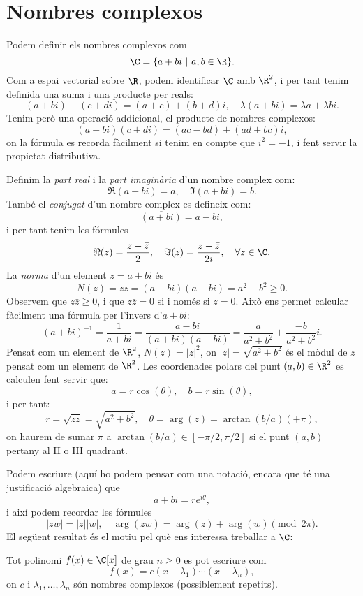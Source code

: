
\appendix
\section{Nombres complexos}
Podem definir els nombres complexos com
\[
\C =\{a+bi ~|~ a,b\in\R\}.
\]
Com a espai vectorial sobre $\R$, podem identificar $\C$ amb $\R^2$, i per tant tenim definida una suma i una producte per reals:
\[
(a+bi) + (c+di) = (a+c) + (b+d)i, \quad \lambda(a+bi)=\lambda a + \lambda b i.
\]
Tenim però una operació addicional, el producte de nombres complexos:
\[
(a+bi)(c+di) = (ac-bd) + (ad+bc)i,
\]
on la fórmula es recorda fàcilment si tenim en compte que $i^2=-1$, i fent servir la propietat distributiva.

Definim la \emph{part real} i la \emph{part imaginària}  d'un nombre complex com:
\[
\Re(a+bi) = a,\quad \Im(a+bi) = b.
\]
També el \emph{conjugat} d'un nombre complex es defineix com:
\[
\overline{(a+bi)} = a-bi,
\]
i per tant tenim les fórmules
\[
\Re(z) = \frac{z+\bar z}{2},\quad \Im(z)=\frac{z-\bar z}{2i},\quad \forall z\in\C.
\]
La \emph{norma} d'un element $z=a+bi$ és
\[
N(z) = z\bar z = (a+bi)(a-bi) = a^2+b^2\geq 0.
\]
Observem que $z\bar z \geq 0$, i que $z\bar z = 0$ si i només si $z=0$. Això ens permet calcular fàcilment una fórmula per l'invers d'$a+bi$:
\[
(a+bi)^{-1} = \frac{1}{a+bi} = \frac{a-bi}{(a+bi)(a-bi)} = \frac{a}{a^2+b^2}+\frac{-b}{a^2+b^2}i.
\]
Pensat com un element de $\R^2$, $N(z)=|z|^2$, on $|z|=\sqrt{a^2+b^2}$ és el mòdul de $z$ pensat com un element de $\R^2$. Les coordenades polars del punt $(a,b)\in\R^2$ es calculen fent servir que:
\[
a = r\cos(\theta),\quad b = r\sin(\theta),
\]
i per tant:
\[
r = \sqrt{z\bar z}=\sqrt{a^2+b^2},\quad \theta = \arg(z) = \arctan(b/a) (+\pi),
\]
on haurem de sumar $\pi$ a $\arctan(b/a)\in[-\pi/2,\pi/2]$ si el punt $(a,b)$ pertany al II o III quadrant.

Podem escriure (aquí ho podem pensar com una notació, encara que té una justificació algebraica) que
\[
a+bi = re^{i\theta},
\]
i així podem recordar les fórmules
\[
|zw|=|z||w|,\quad \arg(zw)=\arg(z)+\arg(w)\pmod{2\pi}.
\]
El següent resultat és el motiu pel què ens interessa treballar a $\C$:

\begin{teorema}
Tot polinomi $f(x)\in \C[x]$ de grau $n\geq 0$ es pot escriure com
\[
f(x) = c (x-\lambda_1)\cdots (x-\lambda_n),
\]
on $c$ i $\lambda_1,\ldots,\lambda_n$ són nombres complexos (possiblement repetits).
\end{teorema}
